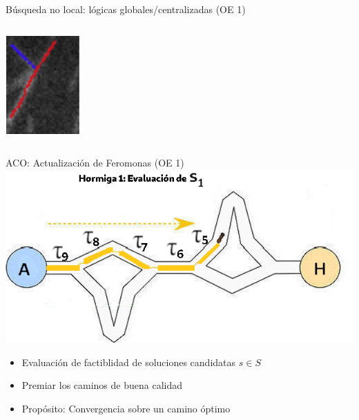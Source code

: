 \begin{frame}{B\'usqueda no local: l\'ogicas globales/centralizadas (OE 1)}
\begin{columns}
\begin{column}{0.2\textwidth}
        \vspace{0.5cm}
        \includegraphics[scale=0.5]{Pictures/NoConsenso4.png}
        \end{column}
    \end{columns}
\end{frame}

\begin{frame}{ACO: Actualizaci\'on de Feromonas (OE 1)}
\centering
\includegraphics[scale=0.4]{Pictures/ACO-ant-ferom.png}
\begin{itemize}
    \item Evaluaci\'on de factiblidad de soluciones candidatas $s \in S$
    \item Premiar los caminos de buena calidad
    \item Prop\'osito: Convergencia sobre un camino \'optimo
\end{itemize}
\end{frame}


